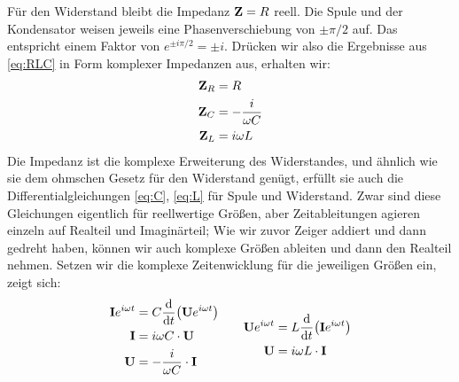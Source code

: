 Für den Widerstand bleibt die Impedanz $\mathbf{Z} = R$ reell. Die Spule und der Kondensator weisen jeweils eine
Phasenverschiebung von $\pm \pi/2$ auf. Das entspricht einem Faktor von $e^{\pm i\pi/2}= \pm i$. Drücken wir also die
Ergebnisse aus \eqref{eq:RLC} in Form komplexer Impedanzen aus, erhalten wir:
\begin{align}
    \mathbf{Z}_R &= R \\
    \mathbf{Z}_C &= -\frac i{\omega C} \\
    \mathbf{Z}_L &= i\omega L
\end{align}
Die Impedanz ist die komplexe Erweiterung des Widerstandes, und ähnlich wie sie dem ohmschen Gesetz für den Widerstand
genügt, erfüllt sie auch die Differentialgleichungen \eqref{eq:C}, \eqref{eq:L} für Spule und Widerstand. Zwar sind
diese Gleichungen eigentlich für reellwertige Größen, aber Zeitableitungen agieren einzeln auf Realteil und
Imaginärteil; Wie wir zuvor Zeiger addiert und dann gedreht haben, können wir auch komplexe Größen ableiten und dann den
Realteil nehmen. Setzen wir die komplexe Zeitenwicklung für die jeweiligen Größen ein, zeigt sich:
\begin{gather*}
    \begin{aligned}
        \mathbf{I}e^{i\omega t} &= C\dv{t}(\mathbf{U}e^{i\omega t}) \\
        \mathbf{I} &= i\omega C \cdot \mathbf{U} \\
        \mathbf{U} &= - \frac{i}{\omega C} \cdot \mathbf{I}
    \end{aligned}
    \qquad
    \begin{aligned}
        \mathbf{U}e^{i\omega t} &= L\dv{t}(\mathbf{I}e^{i\omega t}) \\
        \mathbf{U} &= i\omega L \cdot \mathbf{I}
    \end{aligned}
\end{gather*}

